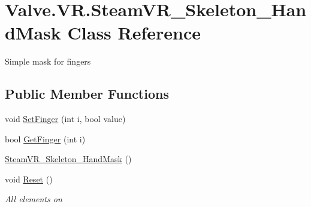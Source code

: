 \hypertarget{class_valve_1_1_v_r_1_1_steam_v_r___skeleton___hand_mask}{}\section{Valve.\+V\+R.\+Steam\+V\+R\+\_\+\+Skeleton\+\_\+\+Hand\+Mask Class Reference}
\label{class_valve_1_1_v_r_1_1_steam_v_r___skeleton___hand_mask}


Simple mask for fingers  


\subsection*{Public Member Functions}
\begin{DoxyCompactItemize}
\item 
void \mbox{\hyperlink{class_valve_1_1_v_r_1_1_steam_v_r___skeleton___hand_mask_adf61ea56d80553ec467608036c88c0e2}{Set\+Finger}} (int i, bool value)
\item 
bool \mbox{\hyperlink{class_valve_1_1_v_r_1_1_steam_v_r___skeleton___hand_mask_ac79e67fa59b6c4a65d984bd7fa0a5615}{Get\+Finger}} (int i)
\item 
\mbox{\hyperlink{class_valve_1_1_v_r_1_1_steam_v_r___skeleton___hand_mask_a5a2dd2ef2430ef55701b522adc789bd4}{Steam\+V\+R\+\_\+\+Skeleton\+\_\+\+Hand\+Mask}} ()
\item 
void \mbox{\hyperlink{class_valve_1_1_v_r_1_1_steam_v_r___skeleton___hand_mask_aaf610d3c2ee05ad18f298873deb131dc}{Reset}} ()
\begin{DoxyCompactList}\small\item\em All elements on \end{DoxyCompactList}\end{DoxyCompactItemize}
